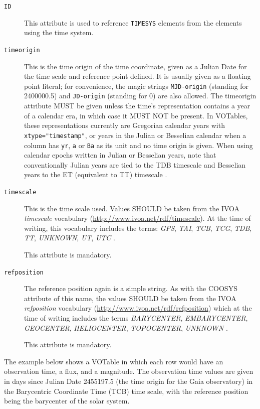 \documentclass[11pt,a4paper]{ivoa}
\let\fg=\color
\def\attr#1{{\tt{\fg{DarkRed}#1}}}
\def\elem#1{{\tt{\fg{DarkRed}#1}}}
\def\attrval#1#2{{\tt{\fg{DarkRed}#1}="{\fg{DarkPurple}#2}"}}
\begin{document}
\begin{description}
\item[\attr{ID}] This attribute is used to reference \elem{TIMESYS}
elements from the elements using the time system.
\item[\attr{timeorigin}] This is the time origin of the time coordinate,
given as a Julian Date for the  time scale and reference point
defined.  It is usually given as a floating point
literal; for convenience, the magic strings \verb|MJD-origin| (standing
for 2400000.5) and \verb|JD-origin| (standing for 0) are also allowed.
The timeorigin attribute MUST be given unless the time's representation
contains a year of a calendar era, in which case it MUST NOT be present.
In VOTables, these
representations currently are Gregorian calendar years with
\attrval{xtype}{timestamp}, or years in the Julian or Besselian calendar when a column
has \verb|yr|, \verb|a| or \verb|Ba| as its unit and no time origin is
given.
When using calendar epochs written in Julian or Besselian years, note that
conventionally Julian years are tied to the TDB timescale and Besselian years to
the ET (equivalent to TT) timescale \citep{2015A+A...574A..36R}.

\item[\attr{timescale}]  This is the time scale used.  Values SHOULD be
taken from the IVOA \emph{timescale} vocabulary (\url{http://www.ivoa.net/rdf/timescale}).
At the time of writing, this vocabulary includes the terms:
\textsl{GPS},
\textsl{TAI},
\textsl{TCB},
\textsl{TCG},
\textsl{TDB},
\textsl{TT},
\textsl{UNKNOWN},
\textsl{UT},
\textsl{UTC}
.

This attribute is mandatory.
\item[\attr{refposition}] The reference position again is a simple string.
As with the COOSYS attribute of this name, the values SHOULD be
taken from the IVOA \emph{refposition} vocabulary
(\url{http://www.ivoa.net/rdf/refposition}) which at the time of writing
includes the terms
\textsl{BARYCENTER},
\textsl{EMBARYCENTER},
\textsl{GEOCENTER},
\textsl{HELIOCENTER},
\textsl{TOPOCENTER},
\textsl{UNKNOWN}
.

This attribute is mandatory.
\end{description}

The example below shows a VOTable in which each row would have an observation
time, a flux, and a magnitude.  The observation time values are given in days since
Julian Date 2455197.5 (the time origin for the Gaia observatory) in the Barycentric
Coordinate Time (TCB) time scale, with the reference position being the barycenter
of the solar system.
\end{document}
